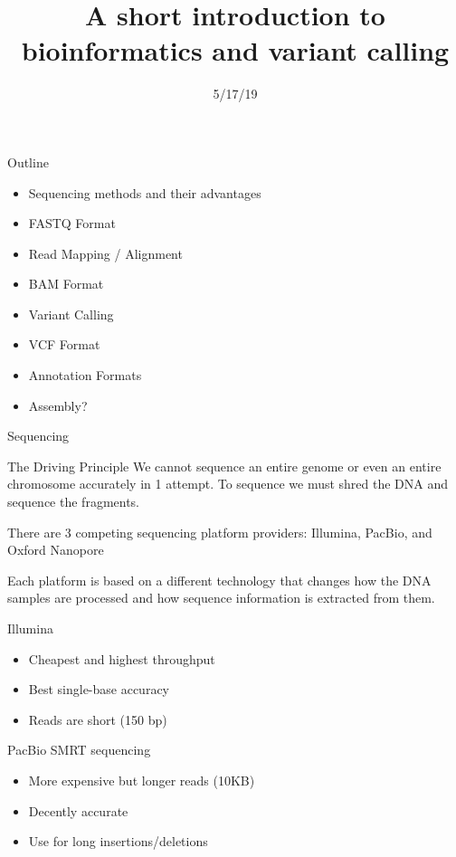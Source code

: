 \documentclass{beamer}
\title[Intro Bioinformatics]{A short introduction to bioinformatics and variant calling}
\date{5/17/19}
\author{Adam Orr\hskip 1em \faicon{twitter}@AdamJOrr}
\begin{document}
\frame{\titlepage}

\begin{frame}{Outline}
	\begin{itemize}
		\item Sequencing methods and their advantages
		\item FASTQ Format
		\item Read Mapping / Alignment
		\item BAM Format
		\item Variant Calling
		\item VCF Format
		\item Annotation Formats
		\item Assembly?
	\end{itemize}
\end{frame}

\begin{frame}{Sequencing}

	\begin{block}{The Driving Principle}
	We cannot sequence an entire genome or even an entire chromosome accurately in 1 attempt. To sequence we must shred the DNA and sequence the fragments.
	\end{block}

	There are 3 competing sequencing platform providers: Illumina, PacBio, and Oxford Nanopore

	Each platform is based on a different technology that changes how the DNA samples are processed and how sequence information is extracted from them.
\end{frame}

\begin{frame}{Illumina}
	\begin{itemize}
		\item Cheapest and highest throughput
		\item Best single-base accuracy
		\item Reads are short (150 bp)
	\end{itemize}
\end{frame}

\begin{frame}{PacBio SMRT sequencing}
	\begin{itemize}
		\item More expensive but longer reads (10KB)
		\item Decently accurate
		\item Use for long insertions/deletions
	\end{itemize}
\end{frame}
\end{document}
